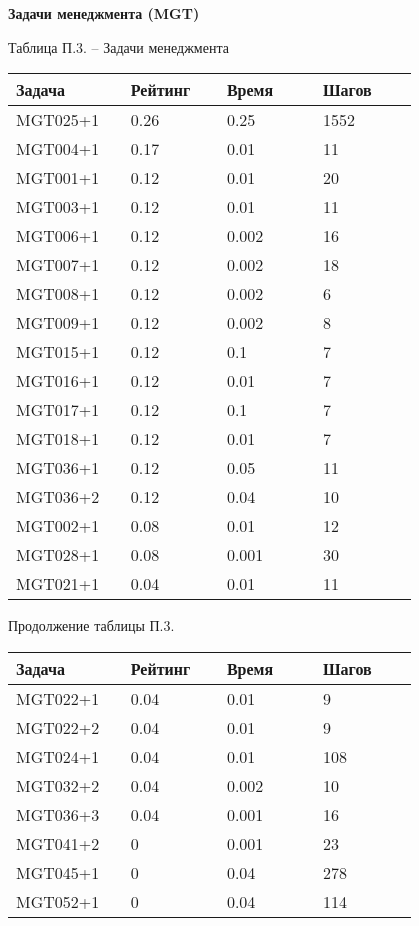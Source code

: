 \textbf{Задачи менеджмента (MGT)}

\begin{center}
Таблица П.3. -- Задачи менеджмента
\end{center}

\begin{longtable}[H]{|p{0.2\linewidth}|p{0.2\linewidth}|p{0.2\linewidth}|p{0.2\linewidth}|}
\hline
\textbf{Задача} & \textbf{Рейтинг} & \textbf{Время} & \textbf{Шагов} \\
\hline
MGT025+1 &  0.26 &  0.25 &  1552 \\
\hline
MGT004+1 &  0.17 &  0.01 &  11 \\
\hline
MGT001+1 &  0.12 &  0.01 &  20 \\
\hline
MGT003+1 &  0.12 &  0.01 &  11 \\
\hline
MGT006+1 &  0.12 &  0.002 &  16 \\
\hline
MGT007+1 &  0.12 &  0.002 &  18 \\
\hline
MGT008+1 &  0.12 &  0.002 &  6 \\
\hline
MGT009+1 &  0.12 &  0.002 &  8 \\
\hline
MGT015+1 &  0.12 &  0.1 &  7 \\
\hline
MGT016+1 &  0.12 &  0.01 &  7 \\
\hline
MGT017+1 &  0.12 &  0.1 &  7 \\
\hline
MGT018+1 &  0.12 &  0.01 &  7 \\
\hline
MGT036+1 &  0.12 &  0.05 &  11 \\
\hline
MGT036+2 &  0.12 &  0.04 &  10 \\
\hline
MGT002+1 &  0.08 &  0.01 &  12 \\
\hline
MGT028+1 &  0.08 &  0.001 &  30 \\
\hline
MGT021+1 &  0.04 &  0.01 &  11 \\
\hline
\end{longtable}
\begin{center}
Продолжение таблицы П.3.
\end{center}

\begin{longtable}[H]{|p{0.2\linewidth}|p{0.2\linewidth}|p{0.2\linewidth}|p{0.2\linewidth}|}
\hline
\textbf{Задача} & \textbf{Рейтинг} & \textbf{Время} & \textbf{Шагов} \\
\hline
MGT022+1 &  0.04 &  0.01 &  9 \\
\hline
MGT022+2 &  0.04 &  0.01 &  9 \\
\hline
MGT024+1 &  0.04 &  0.01 &  108 \\
\hline
MGT032+2 &  0.04 &  0.002 &  10 \\
\hline
MGT036+3 &  0.04 &  0.001 &  16 \\
\hline
MGT041+2 &  0 &  0.001 &  23 \\
\hline
MGT045+1 &  0 &  0.04 &  278 \\
\hline
MGT052+1 &  0 &  0.04 &  114 \\
\hline
\end{longtable}



